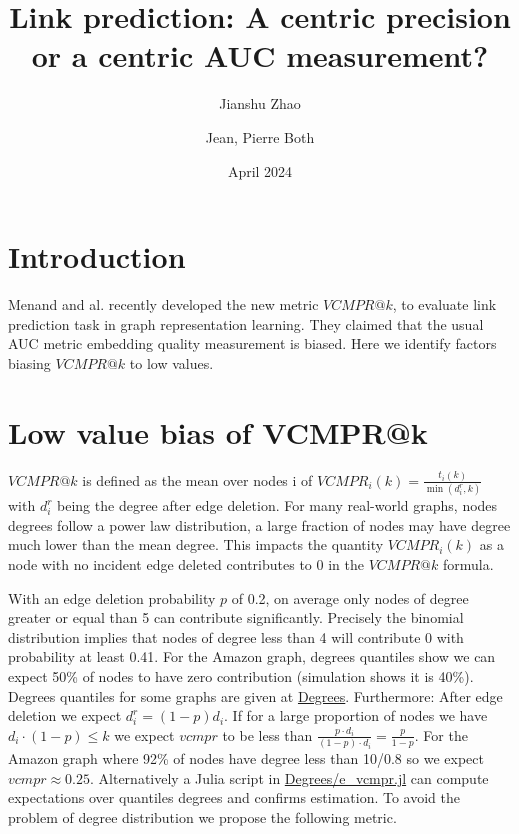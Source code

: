 \documentclass{article}
\title{Link prediction: A centric precision or a centric AUC measurement?}
\author[1]{Jianshu Zhao}
\author[2,*]{Jean, Pierre Both}
\affil[1]{Center for Bioinformatics and Computational Genomics, Georgia Institute of Technology, Atlanta, Georgia, USA}
\affil[2]{Université Paris-Saclay, CEA, List, Palaiseau, France. (Retired)}
\affil[*]{Corresponding author : jeanpierre.both@gmail.com}
\date{April 2024}
\begin{document}
\maketitle

\section{Introduction}

Menand and al. \cite{Menand2024link} recently developed the new metric $VCMPR@k$, to evaluate link prediction task in graph representation learning.
They claimed that the usual AUC metric embedding quality measurement is biased.
Here we identify factors biasing $VCMPR@k$ to low values.


\section{Low value bias of VCMPR@k}
$VCMPR@k$ is defined as the mean over nodes i of  $ VCMPR_{i}(k)= \frac{t_{i}(k)}{\min(d_{i}^{r},k)}$ with $ d_{i}^{r} $ being the degree after edge deletion.
For many real-world graphs, nodes degrees follow a power law distribution, a large fraction of nodes may have degree much lower than the mean degree.
This impacts the quantity $ VCMPR_{i}(k)$ as a node with no incident edge deleted contributes to 0 in the $VCMPR@k$ formula.

With an edge deletion probability $p$ of 0.2, on average only nodes of degree greater or equal than 5 can contribute significantly. Precisely the binomial distribution implies that nodes of degree less than 4 will contribute 0 with probability at least 0.41.
For the Amazon graph, degrees quantiles show we can expect 50\% of nodes to have zero contribution (simulation shows it is 40\%).
Degrees quantiles for some graphs are given at \href{https://github.com/jean-pierreBoth/linkauc/tree/master/Degrees}{\color{blue}Degrees}.
Furthermore: After edge deletion we expect $ d_{i}^{r} = (1 - p) d_{i} $.
If for a large proportion of nodes we have $ d_{i} \cdot (1 - p) \leq k $ we expect $vcmpr$ to be less
than  $\frac{p \cdot d_{i}}{(1- p) \cdot d_{i}} = \frac{p}{1-p}$.
For the Amazon graph where 92\% of nodes have degree less than 10/0.8 so we expect $vcmpr \approx 0.25$.
Alternatively a Julia script in \href{https://github.com/jean-pierreBoth/linkauc/tree/master/Degrees}{\color{blue}Degrees/e\_vcmpr.jl} can compute expectations over quantiles degrees and confirms estimation.
To avoid the problem of degree distribution we propose the following metric.
\end{document}
